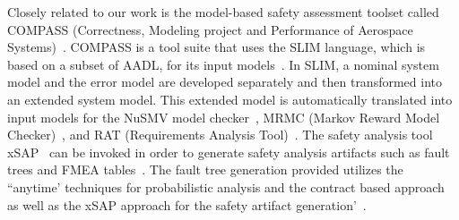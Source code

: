 Closely related to our work is the model-based safety assessment toolset called COMPASS (Correctness, Modeling project and Performance of Aerospace Systems)~\cite{10.1007/978-3-642-04468-7_15}.  COMPASS is a tool suite that uses the SLIM language, which is based on a subset of AADL, for its input models~\cite{5185388, criticalembeddedsystems}. In SLIM, a nominal system model and the error model are developed separately and then transformed into an extended system model.  This extended model is automatically translated into input models for the NuSMV model checker~\cite{Cimatti2000, NuSMV}, MRMC (Markov Reward Model Checker)~\cite{Katoen:2005:MRM:1114692.1115230, MRMC}, and RAT (Requirements Analysis Tool)~\cite{RAT}. The safety analysis tool xSAP~\cite{DBLP:conf/tacas/BittnerBCCGGMMZ16} can be invoked in order to generate safety analysis artifacts such as fault trees and FMEA tables~\cite{compass30toolset}. The fault tree generation provided utilizes the ``anytime' techniques for probabilistic analysis and the contract based approach as well as the xSAP approach for the safety artifact generation'~\cite{10.1007/978-3-642-04468-7_15}.







